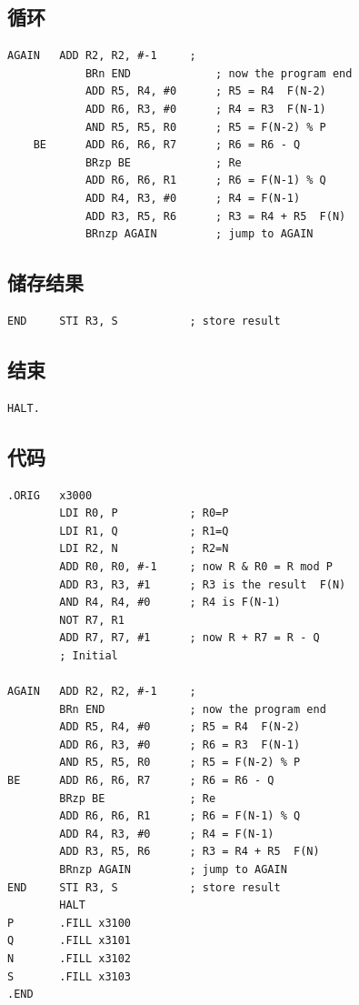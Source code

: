 \documentclass[UTF8]{ctexart}
\begin{document}
\subsection{循环}
\begin{lstlisting}[basicstyle=\ttfamily,language={[x86masm]Assembler}]
    AGAIN   ADD R2, R2, #-1     ;
            BRn END             ; now the program end
            ADD R5, R4, #0      ; R5 = R4  F(N-2)
            ADD R6, R3, #0      ; R4 = R3  F(N-1)
            AND R5, R5, R0      ; R5 = F(N-2) % P
    BE      ADD R6, R6, R7      ; R6 = R6 - Q
            BRzp BE             ; Re
            ADD R6, R6, R1      ; R6 = F(N-1) % Q
            ADD R4, R3, #0      ; R4 = F(N-1)
            ADD R3, R5, R6      ; R3 = R4 + R5  F(N)
            BRnzp AGAIN         ; jump to AGAIN
\end{lstlisting}


\subsection{储存结果}
\begin{lstlisting}[basicstyle=\ttfamily,language={[x86masm]Assembler}]
    END     STI R3, S           ; store result
\end{lstlisting}

\subsection{结束}  
\begin{lstlisting}[basicstyle=\ttfamily,language={[x86masm]Assembler}]
    HALT.
\end{lstlisting}

\subsection{代码}    
\begin{lstlisting}[basicstyle=\ttfamily,language={[x86masm]Assembler}]
    .ORIG   x3000
        LDI R0, P           ; R0=P
        LDI R1, Q           ; R1=Q
        LDI R2, N           ; R2=N
        ADD R0, R0, #-1     ; now R & R0 = R mod P
        ADD R3, R3, #1      ; R3 is the result  F(N)
        AND R4, R4, #0      ; R4 is F(N-1)
        NOT R7, R1          
        ADD R7, R7, #1      ; now R + R7 = R - Q
        ; Initial
    
AGAIN   ADD R2, R2, #-1     ;
        BRn END             ; now the program end
        ADD R5, R4, #0      ; R5 = R4  F(N-2)
        ADD R6, R3, #0      ; R6 = R3  F(N-1)
        AND R5, R5, R0      ; R5 = F(N-2) % P
BE      ADD R6, R6, R7      ; R6 = R6 - Q
        BRzp BE             ; Re
        ADD R6, R6, R1      ; R6 = F(N-1) % Q
        ADD R4, R3, #0      ; R4 = F(N-1)
        ADD R3, R5, R6      ; R3 = R4 + R5  F(N)
        BRnzp AGAIN         ; jump to AGAIN
END     STI R3, S           ; store result
        HALT
P       .FILL x3100
Q       .FILL x3101
N       .FILL x3102
S       .FILL x3103
.END
\end{lstlisting}
\end{document}
